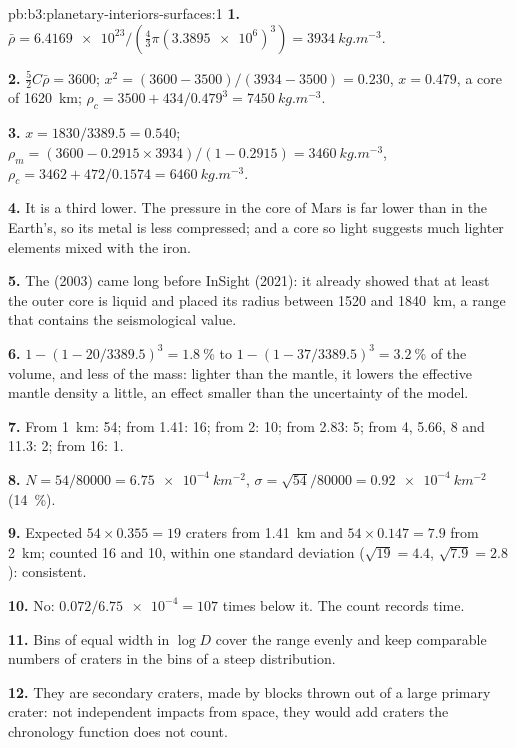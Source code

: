 \begin{solution}{pb:b3:planetary-interiors-surfaces:1}
\textbf{1.} $\bar\rho = \num{6.4169e23}/(\tfrac43\pi(\num{3.3895e6})^3) =
\qty{3934}{kg.m^{-3}}$.

\textbf{2.} $\tfrac52C\bar\rho = 3600$; $x^2 = (3600 - 3500)/(3934 - 3500) =
0.230$, $x = 0.479$, a core of \qty{1620}{km}; $\rho_c = 3500 +
434/0.479^3 = \qty{7450}{kg.m^{-3}}$.

\textbf{3.} $x = 1830/3389.5 = 0.540$; $\rho_m = (3600 - 0.2915\times
3934)/(1 - 0.2915) = \qty{3460}{kg.m^{-3}}$, $\rho_c = 3462 +
472/0.1574 = \qty{6460}{kg.m^{-3}}$.

\textbf{4.} It is a third lower. The pressure in the core of Mars is far
lower than in the Earth's, so its metal is less compressed; and a core so
light suggests much lighter elements mixed with the iron.

\textbf{5.} The  (2003) came long before InSight (2021): it
already showed that at least the outer core is liquid and placed its
radius between 1520 and \qty{1840}{km}, a range that contains the
seismological value.

\textbf{6.} $1 - (1 - 20/3389.5)^3 = \qty{1.8}{\percent}$ to $1 - (1 -
37/3389.5)^3 = \qty{3.2}{\percent}$ of the volume, and less of the mass:
lighter than the mantle, it lowers the effective mantle density a little,
an effect smaller than the uncertainty of the model.

\textbf{7.} From \qty{1}{km}: 54; from 1.41: 16; from 2: 10; from 2.83: 5;
from 4, 5.66, 8 and 11.3: 2; from 16: 1.

\textbf{8.} $N = 54/80000 = \qty{6.75e-4}{km^{-2}}$, $\sigma = \sqrt{54}/80000
= \qty{0.92e-4}{km^{-2}}$ (\qty{14}{\percent}).

\textbf{9.} Expected $54\times0.355 = 19$ craters from \qty{1.41}{km} and
$54\times0.147 = 7.9$ from \qty{2}{km}; counted 16 and 10, within one
standard deviation ($\sqrt{19} = 4.4$, $\sqrt{7.9} = 2.8$): consistent.

\textbf{10.} No: $0.072/\num{6.75e-4} = 107$ times below it. The count
records time.

\textbf{11.} Bins of equal width in $\log D$ cover the range evenly and
keep comparable numbers of craters in the bins of a steep distribution.

\textbf{12.} They are secondary craters, made by blocks thrown out of a
large primary crater: not independent impacts from space, they would add
craters the chronology function does not count.


\end{solution}
